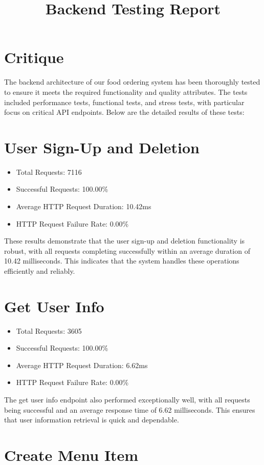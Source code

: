\documentclass{article}
\begin{document}
\section{Critique}
\title{Backend Testing Report}

The backend architecture of our food ordering system has been thoroughly tested to ensure it meets the required functionality and quality attributes. The tests included performance tests, functional tests, and stress tests, with particular focus on critical API endpoints. Below are the detailed results of these tests:

\section{User Sign-Up and Deletion}

\begin{itemize}
  \item Total Requests: 7116
  \item Successful Requests: 100.00\%
  \item Average HTTP Request Duration: 10.42ms
  \item HTTP Request Failure Rate: 0.00\%
\end{itemize}

These results demonstrate that the user sign-up and deletion functionality is robust, with all requests completing successfully within an average duration of 10.42 milliseconds. This indicates that the system handles these operations efficiently and reliably.

\section{Get User Info}

\begin{itemize}
  \item Total Requests: 3605
  \item Successful Requests: 100.00\%
  \item Average HTTP Request Duration: 6.62ms
  \item HTTP Request Failure Rate: 0.00\%
\end{itemize}

The get user info endpoint also performed exceptionally well, with all requests being successful and an average response time of 6.62 milliseconds. This ensures that user information retrieval is quick and dependable.

\section{Create Menu Item}
\end{document}
